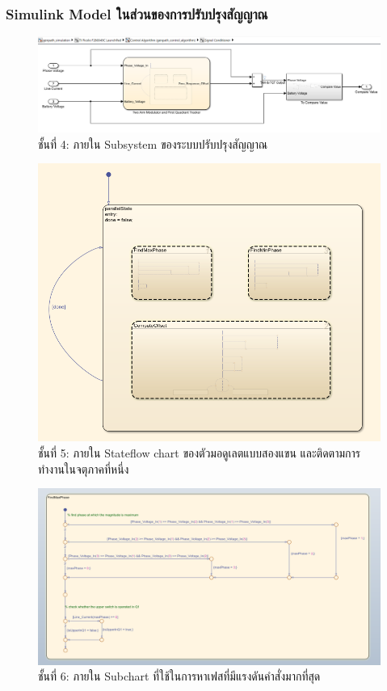 \documentclass[11pt,a4paper]{article}
\begin{document}
\subsubsection{Simulink Model ในส่วนของการปรับปรุงสัญญาณ}

\begin{figure}[H]
    \centering
    \includegraphics[width=\textwidth]{l4-sig-cond.png}
    \caption{ชั้นที่ 4: ภายใน Subsystem ของระบบปรับปรุงสัญญาณ}
\end{figure}

\begin{figure}[H]
    \centering
    \includegraphics[width=\textwidth]{tam-fqt-l1.png}
    \caption{ชั้นที่ 5: ภายใน Stateflow chart ของตัวมอดูเลตแบบสองแขน และติดตามการทำงานในจตุภาคที่หนึ่ง}
\end{figure}

\begin{figure}[H]
    \centering
    \includegraphics[width=\textwidth]{tam-fqt-l2-1.png}
    \caption{ชั้นที่ 6: ภายใน Subchart ที่ใช้ในการหาเฟสที่มีแรงดันคำสั่งมากที่สุด}
\end{figure}
\end{document}
